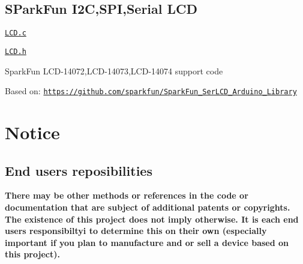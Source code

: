 \subsection*{S\+Park\+Fun I2C,S\+PI,Serial L\+CD}


\begin{DoxyItemize}
\item \href{hardware/LCD.c}{\tt L\+C\+D.\+c}
\item \href{hardware/LCD.h}{\tt L\+C\+D.\+h}
\begin{DoxyItemize}
\item Spark\+Fun L\+C\+D-\/14072,L\+C\+D-\/14073,L\+C\+D-\/14074 support code
\item Based on\+: \href{https://github.com/sparkfun/SparkFun_SerLCD_Arduino_Library}{\tt https\+://github.\+com/sparkfun/\+Spark\+Fun\+\_\+\+Ser\+L\+C\+D\+\_\+\+Arduino\+\_\+\+Library}
\end{DoxyItemize}
\end{DoxyItemize}





\section*{Notice}

\subsection*{End users reposibilities}

{\bfseries There may be other methods or references in the code or documentation that are subject of additional patents or copyrights. The existence of this project does not imply otherwise. It is each end users responsibiltyi to determine this on their own (especially important if you plan to manufacture and or sell a device based on this project).} 